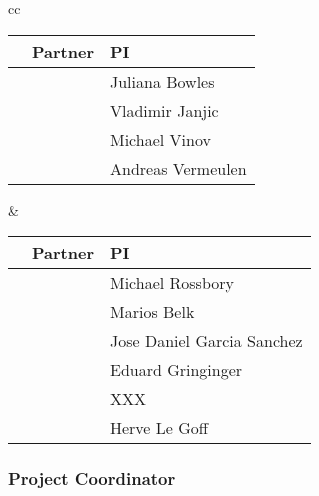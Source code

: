 \documentclass[a4paper,11pt]{article}
\begin{document}

\begin{center}
\begin{tabular}{cc}
\begin{tabular}{|l|l|l|}\hline
& \textbf{Partner} & \textbf{PI} \\ \hline
\addtocounter{partic}{1}
\thepartic & \participantshort{\thepartic} &  Juliana Bowles \\\hline
\addtocounter{partic}{1}
\thepartic & \participantshort{\thepartic} &  Vladimir Janjic \\\hline
\addtocounter{partic}{1}
\thepartic & \participantshort{\thepartic} &  Michael Vinov \\\hline
\addtocounter{partic}{1}
\thepartic & \participantshort{\thepartic} &  Andreas Vermeulen \\\hline
\end{tabular}
\quad\quad&\quad\quad
\begin{tabular}{|l|l|l|}\hline
& \textbf{Partner} & \textbf{PI} \\ \hline
\addtocounter{partic}{1}
\thepartic & \participantshort{\thepartic} & Michael Rossbory \\\hline
\addtocounter{partic}{1}
\thepartic & \participantshort{\thepartic} & Marios Belk \\\hline
\addtocounter{partic}{1}
\thepartic & \participantshort{\thepartic} & Jose Daniel Garcia Sanchez \\\hline
\addtocounter{partic}{1}
\thepartic & \participantshort{\thepartic} & Eduard Gringinger \\\hline
\addtocounter{partic}{1}
\thepartic & \participantshort{\thepartic} & XXX \\\hline
\addtocounter{partic}{1}
\thepartic & \participantshort{\thepartic} & Herve Le Goff \\\hline

\end{tabular}
\end{tabular}
\end{center}

\vspace{12pt}
\subsubsection*{Project Coordinator}
\vspace{-6pt}
\end{document}
